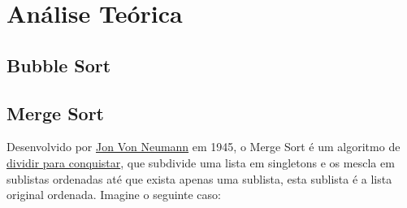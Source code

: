 \chapter{Análise Teórica}
\label{ch:anal_teo} %

\section{Bubble Sort} 

\section{Merge Sort}

Desenvolvido por \href{https://en.wikipedia.org/wiki/John_von_Neumann}{Jon Von Neumann} em 1945, o Merge Sort é um algoritmo de \href{https://en.wikipedia.org/wiki/Divide-and-conquer_algorithm}{dividir para conquistar}, que subdivide uma lista em singletons e os mescla em sublistas ordenadas até que exista apenas uma sublista, esta sublista é a lista original ordenada. Imagine o seguinte caso:

